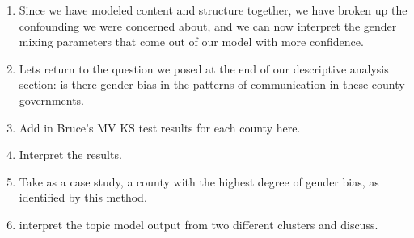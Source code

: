 \documentclass[fleqn]{MJDArticle}
\begin{document}
\begin{enumerate}
	\item Since we have modeled content and structure together, we have broken up the confounding we were concerned about, and we can now interpret the gender mixing parameters that come out of our model with more confidence.
	
	\item Lets return to the question we posed at the end of our descriptive analysis section: is there gender bias in the patterns of communication in these county governments. 
	
	\item Add in Bruce's MV KS test results for each county here.
	
	\item Interpret the results.
	
	\item Take as a case study, a county with the highest degree of gender bias, as identified by this method.
	
	\item interpret the topic model output from two different clusters and discuss.
	
%
%
%
%
	
	
\end{enumerate}
\end{document}
